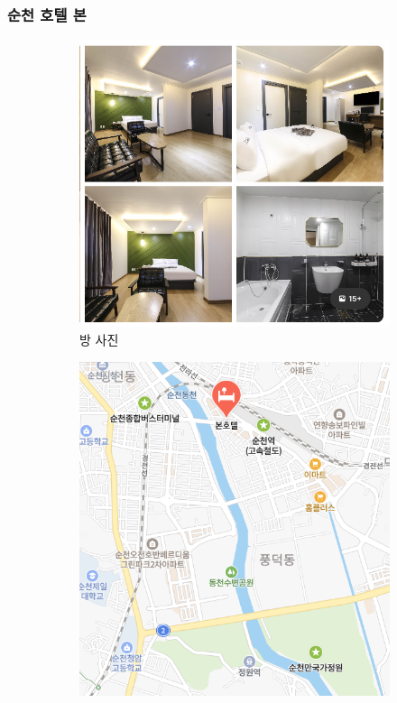 \documentclass[10pt]{article}
\begin{document}
\subsubsection{순천 호텔 본}
\begin{figure}[htbp]
  \centering
  \begin{subfigure}{0.3\textwidth}
    \centering
    \includegraphics[width=\linewidth]{fig/3_방.png}
    \caption{방 사진}
    \label{fig:1}
  \end{subfigure}
  \hfill
  \begin{subfigure}{0.3\textwidth}
    \centering
    \includegraphics[width=\linewidth]{fig/3_위치.png}

\end{subfigure}
\end{figure}
\end{document}
